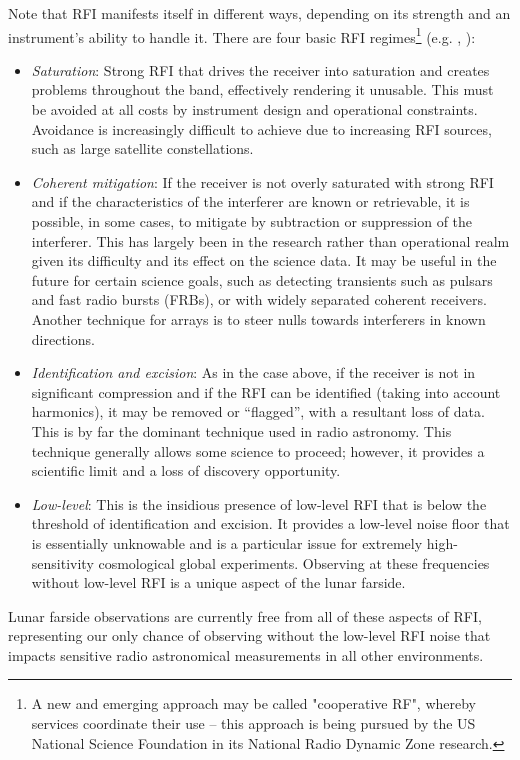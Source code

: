 Note that RFI manifests itself in different ways, depending on its strength and an instrument's ability to handle it.  There are four basic RFI regimes\footnote{A new and emerging approach may be called "cooperative RF", whereby services coordinate their use -- this approach is being pursued by the US National Science Foundation in its National Radio Dynamic Zone research.}
(e.g. \citealt{Ellingson2005}, \citealt{selina2023detrimental}):
\begin{itemize}
    \item {\em Saturation}: Strong RFI that drives the receiver into saturation and creates problems throughout the band, effectively rendering it unusable.  This must be avoided at all costs by instrument design and operational constraints. Avoidance is increasingly difficult to achieve due to increasing RFI sources, such as large satellite constellations.
    \item {\em Coherent mitigation}: If the receiver is not overly saturated with strong RFI and if the characteristics of the interferer are known or retrievable, it is possible, in some cases, to mitigate by subtraction or suppression of the interferer.  This has largely been in the research rather than operational realm given its difficulty and its effect on the science data.  It may be useful in the future for certain science goals, such as detecting transients such as pulsars and fast radio bursts (FRBs), or with widely separated coherent receivers.  Another technique for arrays is to steer nulls towards interferers in known directions.
    \item {\em Identification and excision}:  As in the case above, if the receiver is not in significant compression and if the RFI can be identified (taking into account harmonics), it may be removed or ``flagged'', with a resultant loss of data.  This is by far the dominant technique used in radio astronomy.  This technique generally allows some science to proceed; however, it provides a scientific limit and a loss of discovery opportunity.
    \item {\em Low-level}:  This is the insidious presence of low-level RFI that is below the threshold of identification and excision.  It provides a low-level noise floor that is essentially unknowable and is a particular issue for extremely high-sensitivity cosmological global experiments. Observing at these frequencies without low-level RFI is a unique aspect of the lunar farside.
\end{itemize}
Lunar farside observations are currently free from all of these aspects of RFI, representing our only chance of observing without the low-level RFI noise that impacts sensitive radio astronomical measurements in all other environments.

